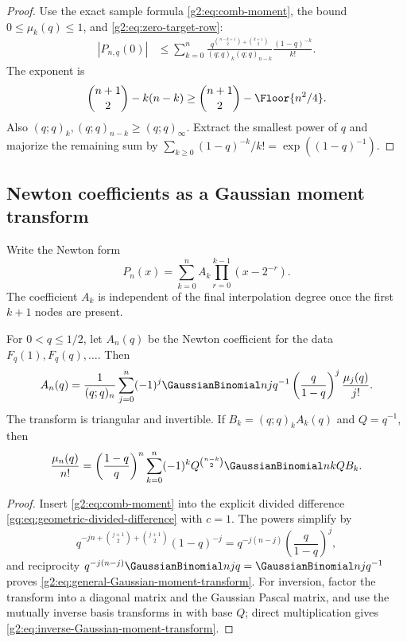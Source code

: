 \begin{proof}
Use the exact sample formula \eqref{g2:eq:comb-moment}, the bound
$0\le\mu_k(q)\le1$, and \eqref{g2:eq:zero-target-row}:
\begin{align*}
 |P_{n,q}(0)|
 &\le\sum_{k=0}^n
 \frac{q^{\binom{n-k+1}{2}+\binom{k+1}{2}}}
 {(q;q)_k(q;q)_{n-k}}
 \frac{(1-q)^{-k}}{k!}.
\end{align*}
The exponent is
\[
 \binom{n+1}{2}-k(n-k)
 \ge\binom{n+1}{2}-\Floor{n^2/4}.
\]
Also $(q;q)_k,(q;q)_{n-k}\ge(q;q)_\infty$.  Extract the smallest power of
$q$ and majorize the remaining sum by
$\sum_{k\ge0}(1-q)^{-k}/k!=\exp((1-q)^{-1})$.
\end{proof}

\subsection{Newton coefficients as a Gaussian moment transform}

Write the Newton form
\begin{equation}
 P_n(x)=\sum_{k=0}^n A_k\prod_{r=0}^{k-1}(x-2^{-r}).
 \label{g2:eq:fabius-newton-form}
\end{equation}
The coefficient $A_k$ is independent of the final interpolation degree once
the first $k+1$ nodes are present.

\begin{theorem}
\label{g2:thm:general-moment-transform}
For $0<q\le1/2$, let $A_n(q)$ be the Newton coefficient for the data
$F_q(1),F_q(q),\ldots$.  Then
\begin{equation}
 A_n(q)=\frac1{(q;q)_n}
 \sum_{j=0}^n(-1)^j
 \GaussianBinomial nj{q^{-1}}
 \left(\frac q{1-q}\right)^j
 \frac{\mu_j(q)}{j!}.
 \label{g2:eq:general-Gaussian-moment-transform}
\end{equation}
The transform is triangular and invertible.  If
$B_k=(q;q)_kA_k(q)$ and $Q=q^{-1}$, then
\begin{equation}
 \frac{\mu_n(q)}{n!}
 =\left(\frac{1-q}{q}\right)^n
 \sum_{k=0}^n(-1)^kQ^{\binom{n-k}{2}}
 \GaussianBinomial nkQ B_k.
 \label{g2:eq:inverse-Gaussian-moment-transform}
\end{equation}
\end{theorem}

\begin{proof}
Insert \eqref{g2:eq:comb-moment} into the explicit divided difference
\eqref{gq:eq:geometric-divided-difference} with $c=1$.  The powers simplify by
\[
 q^{-jn+\binom{j+1}{2}+\binom{j+1}{2}}(1-q)^{-j}
 =q^{-j(n-j)}\left(\frac q{1-q}\right)^j,
\]
and reciprocity
$q^{-j(n-j)}\GaussianBinomial njq=\GaussianBinomial nj{q^{-1}}$ proves
\eqref{g2:eq:general-Gaussian-moment-transform}.
For inversion, factor the transform into a diagonal matrix and the Gaussian
Pascal matrix, and use the mutually inverse basis transforms in
 with base $Q$; direct multiplication
gives \eqref{g2:eq:inverse-Gaussian-moment-transform}.
\end{proof}

